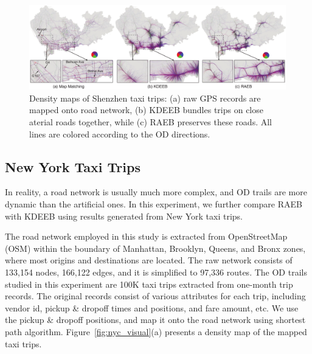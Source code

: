 \begin{figure}[t]
	\centering
	\includegraphics[width=0.995\textwidth]{figure/edgebundling/fig10_study3/shenzhen}
	\vspace{-2mm}
	\caption{
	Density maps of Shenzhen taxi trips: (a) raw GPS records are mapped onto road network, (b) KDEEB bundles trips on close aterial roads together, while (c) RAEB preserves these roads. All lines are colored according to the OD directions.
	}
	\label{fig:shenzhen}
	\vspace{-4mm}
\end{figure}

\subsection{New York Taxi Trips}
\label{ssec:study2}

In reality, a road network is usually much more complex, and OD trails are more dynamic than the artificial ones.
In this experiment, we further compare RAEB with KDEEB using results generated from New York taxi trips.

The road network employed in this study is extracted from OpenStreetMap (OSM) within the boundary of Manhattan, Brooklyn, Queens, and Bronx zones, where most origins and destinations are located.
The raw network consists of 133,154 nodes, 166,122 edges, and it is simplified to 97,336 routes.
The OD trails studied in this experiment are 100K taxi trips extracted from one-month trip records.
The original records consist of various attributes for each trip, including vendor id, pickup \& dropoff times and positions, and fare amount, etc.
We use the pickup \& dropoff positions, and map it onto the road network using shortest path algorithm.
Figure~\ref{fig:nyc_visual}(a) presents a density map of the mapped taxi trips.


